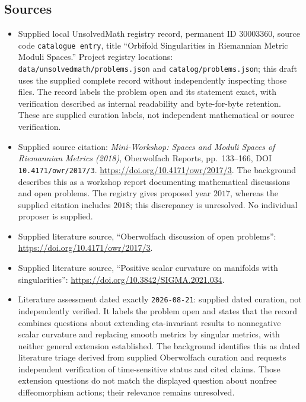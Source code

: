\documentclass[11pt]{article}
\begin{document}
\subsection{Sources}
\begin{itemize}
\item Supplied local UnsolvedMath registry record, permanent ID \(30003360\), source code \texttt{catalogue entry}, title ``Orbifold Singularities in Riemannian Metric Moduli Spaces.'' Project registry locations: \texttt{data/unsolvedmath/problems.json} and \texttt{catalog/problems.json}; this draft uses the supplied complete record without independently inspecting those files. The record labels the problem open and its statement exact, with verification described as internal readability and byte-for-byte retention. These are supplied curation labels, not independent mathematical or source verification.
\item Supplied source citation: \emph{Mini-Workshop: Spaces and Moduli Spaces of Riemannian Metrics (2018)}, Oberwolfach Reports, pp.\ 133--166, DOI \texttt{10.4171/owr/2017/3}. \url{https://doi.org/10.4171/owr/2017/3}. The background describes this as a workshop report documenting mathematical discussions and open problems. The registry gives proposed year \(2017\), whereas the supplied citation includes \(2018\); this discrepancy is unresolved. No individual proposer is supplied.
\item Supplied literature source, ``Oberwolfach discussion of open problems'': \url{https://doi.org/10.4171/owr/2017/3}.
\item Supplied literature source, ``Positive scalar curvature on manifolds with singularities'': \url{https://doi.org/10.3842/SIGMA.2021.034}.
\item Literature assessment dated exactly \texttt{2026-08-21}: supplied dated curation, not independently verified. It labels the problem open and states that the record combines questions about extending eta-invariant results to nonnegative scalar curvature and replacing smooth metrics by singular metrics, with neither general extension established. The background identifies this as dated literature triage derived from supplied Oberwolfach curation and requests independent verification of time-sensitive status and cited claims. Those extension questions do not match the displayed question about nonfree diffeomorphism actions; their relevance remains unresolved.
\end{itemize}
\end{document}
